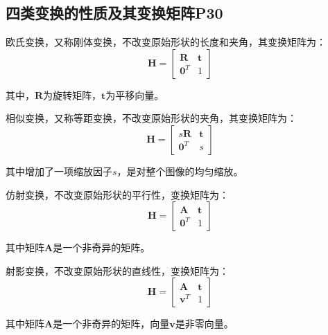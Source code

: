 \documentclass[11pt]{article}
\begin{document}
\subsection{四类变换的性质及其变换矩阵P30}
欧氏变换，又称刚体变换，不改变原始形状的长度和夹角，其变换矩阵为：
\begin{equation*}
  \mathbf{H}=\begin{bmatrix}
    \mathbf{R} & \mathbf{t} \\
    \mathbf{0}^T & 1
  \end{bmatrix} 
\end{equation*}\par
其中，$\mathbf{R}$为旋转矩阵，$\mathbf{t}$为平移向量。\par
相似变换，又称等距变换，不改变原始形状的夹角，其变换矩阵为：
\begin{equation*}
  \mathbf{H}=\begin{bmatrix}
    s\mathbf{R} & \mathbf{t} \\
    \mathbf{0}^T & s
  \end{bmatrix}
\end{equation*}\par
其中增加了一项缩放因子$s$，是对整个图像的均匀缩放。\par
仿射变换，不改变原始形状的平行性，变换矩阵为：
\begin{equation*}
  \mathbf{H}=\begin{bmatrix}
    \mathbf{A} & \mathbf{t} \\
    \mathbf{0}^T & 1
  \end{bmatrix}
\end{equation*}\par
其中矩阵$\mathbf{A}$是一个非奇异的矩阵。\par
射影变换，不改变原始形状的直线性，变换矩阵为：
\begin{equation*}
  \mathbf{H}=\begin{bmatrix}
    \mathbf{A} & \mathbf{t} \\
    \mathbf{v}^T & 1
  \end{bmatrix}
\end{equation*}\par
其中矩阵$\mathbf{A}$是一个非奇异的矩阵，向量$\mathbf{v}$是非零向量。
\end{document}
